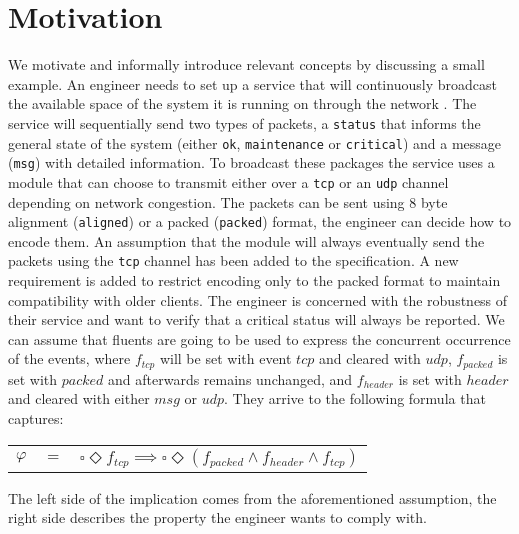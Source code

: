 \section{Motivation}\label{sec:motivation}
We motivate and informally introduce relevant concepts by discussing a small example.
An engineer needs to set up a service that will continuously broadcast the available space of the system it is running on through the network . The service will sequentially send two types of packets, a \texttt{status} that informs the general state of the system (either \texttt{ok}, \texttt{maintenance} or \texttt{critical}) and a message (\texttt{msg}) with detailed information. To broadcast these packages the service uses a module that can choose to transmit either over a \texttt{tcp} or an \texttt{udp} channel depending on network congestion. The packets can be sent using 8 byte alignment (\texttt{aligned}) or a packed (\texttt{packed}) format, the engineer can decide how to encode them. 
An assumption that the module will always eventually send the packets using the \texttt{tcp} channel has been added to the specification. A new requirement is added to restrict encoding only to the packed format to maintain compatibility with older clients. The engineer is concerned with the robustness of their service and want to verify that a critical status will always be reported. We can assume that fluents are going to be used to express the concurrent occurrence of the events, where $f_{tcp}$ will be set with event $tcp$ and cleared with $udp$, $f_{packed}$ is set with $packed$ and afterwards remains unchanged, and $f_{header}$ is set with $header$ and cleared with either $msg$ or $udp$. They arrive to the following formula that captures:

\begin{center}
	\begin{tabular}{ r c l }
		$\varphi$& $=$ &$\square \Diamond f_{tcp}\implies\square \Diamond (f_{packed} \wedge f_{header} \wedge f_{tcp})$\\
	\end{tabular}
\end{center} 
The left side of the implication comes from the aforementioned assumption, the right side describes the property the engineer wants to comply with.

